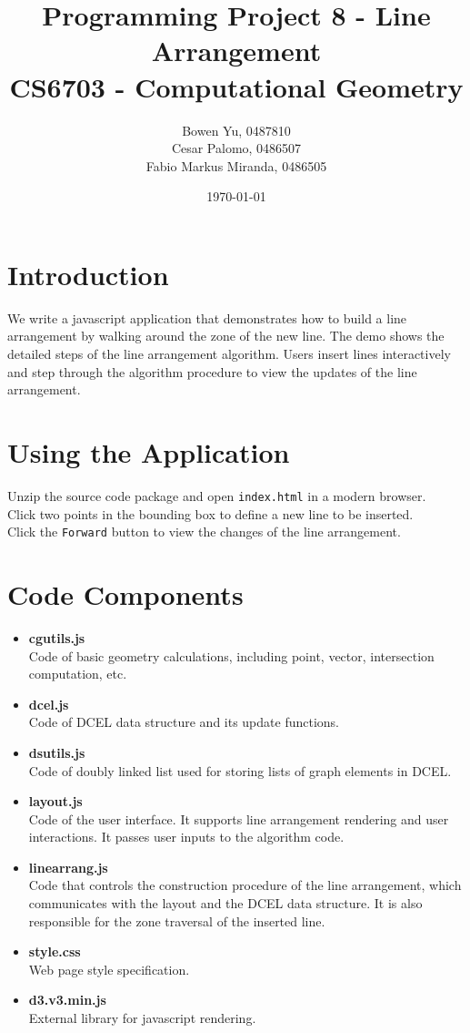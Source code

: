 \documentclass[11pt]{article}
\title{\bf Programming Project 8 - Line Arrangement\\[2ex] 
       \rm\Large CS6703 - Computational Geometry}
\author{Bowen Yu, 0487810\\
		Cesar Palomo, 0486507\\
		Fabio Markus Miranda, 0486505}
\date{\today}
\begin{document}
\maketitle
\large

\section{Introduction}

We write a javascript application that demonstrates how to build a line arrangement by walking around the zone of the new line. The demo shows the detailed steps of the line arrangement algorithm. Users insert lines interactively and step through the algorithm procedure to view the updates of the line arrangement. 

\section{Using the Application}
Unzip the source code package and open {\tt index.html} in a modern browser.\\
Click two points in the bounding box to define a new line to be inserted.\\
Click the {\tt Forward} button to view the changes of the line arrangement.

\section{Code Components}
\begin{itemize}
\item {\bf cgutils.js}\\
Code of basic geometry calculations, including point, vector, intersection computation, etc.
\item {\bf dcel.js}\\
Code of DCEL data structure and its update functions.
\item {\bf dsutils.js}\\
Code of doubly linked list used for storing lists of graph elements in DCEL. 
\item {\bf layout.js}\\
Code of the user interface. It supports line arrangement rendering and user interactions. It passes user inputs to the algorithm code.
\item {\bf linearrang.js}\\
Code that controls the construction procedure of the line arrangement, which communicates with the layout and the DCEL data structure. It is also responsible for the zone traversal of the inserted line.
\item {\bf style.css}\\
Web page style specification.
\item {\bf d3.v3.min.js}\\
External library for javascript rendering.
\end{itemize}
\end{document}
